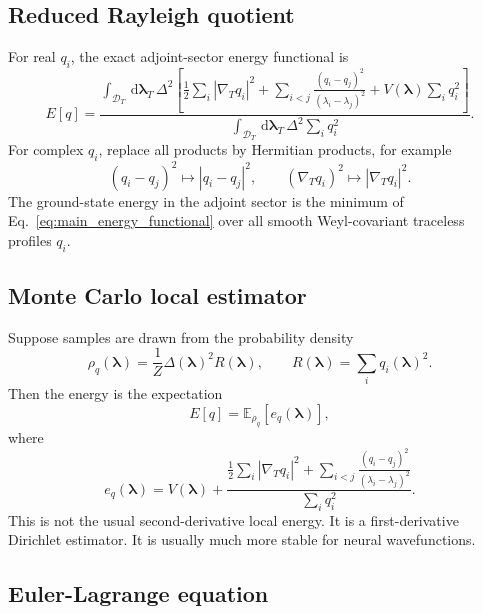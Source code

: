 \documentclass[11pt]{article}
\newcommand{\dd}{\,\mathrm d}
\newcommand{\E}{\mathbb E}
\newcommand{\calD}{\mathcal D}
\newcommand{\gradT}{\nabla_{\!T}}
\begin{document}
\subsection{Reduced Rayleigh quotient}

For real $q_i$, the exact adjoint-sector energy functional is
\begin{equation}
\boxed{
E[q]=
\frac{
\int_{\calD_T}\dd\bm\lambda_T\,\Delta^2
\left[
\frac12\sum_i |\gradT q_i|^2
+
\sum_{i<j}\frac{(q_i-q_j)^2}{(\lambda_i-\lambda_j)^2}
+
V(\bm\lambda)\sum_i q_i^2
\right]
}{
\int_{\calD_T}\dd\bm\lambda_T\,\Delta^2\sum_iq_i^2
}.
}
\label{eq:main_energy_functional}
\end{equation}
For complex $q_i$, replace all products by Hermitian products, for example
\begin{equation}
(q_i-q_j)^2\mapsto |q_i-q_j|^2,
\qquad
(\gradT q_i)^2\mapsto |\gradT q_i|^2.
\end{equation}
The ground-state energy in the adjoint sector is the minimum of Eq.~\eqref{eq:main_energy_functional} over all smooth Weyl-covariant traceless profiles $q_i$.

\subsection{Monte Carlo local estimator}

Suppose samples are drawn from the probability density
\begin{equation}
\rho_q(\bm\lambda)
=\frac1Z\Delta(\bm\lambda)^2R(\bm\lambda),
\qquad
R(\bm\lambda)=\sum_iq_i(\bm\lambda)^2.
\end{equation}
Then the energy is the expectation
\begin{equation}
\boxed{
E[q]=\E_{\rho_q}\left[e_q(\bm\lambda)\right],
}
\end{equation}
where
\begin{equation}
\boxed{
 e_q(\bm\lambda)
=V(\bm\lambda)
+\frac{
\frac12\sum_i |\gradT q_i|^2
+
\sum_{i<j}\frac{(q_i-q_j)^2}{(\lambda_i-\lambda_j)^2}
}{
\sum_iq_i^2
}.
}
\label{eq:dirichlet_local_estimator}
\end{equation}
This is not the usual second-derivative local energy.  It is a first-derivative Dirichlet estimator.  It is usually much more stable for neural wavefunctions.

\subsection{Euler-Lagrange equation}
\end{document}
